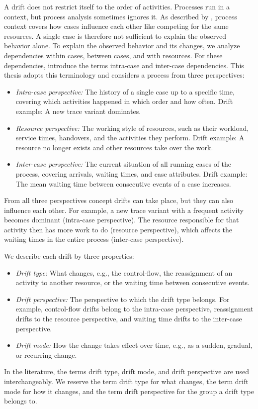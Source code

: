 A drift does not restrict itself to the order of activities. Processes run in a context, but process analysis sometimes ignores it. As described by \textcite{vanderaalst2016process}, process context covers how cases influence each other like competing for the same resources. A single case is therefore not sufficient to explain the observed behavior alone. To explain the observed behavior and its changes, we analyze dependencies within cases, between cases, and with resources. For these dependencies, \textcite{senderovich2017intra} introduce the terms intra-case and inter-case dependencies. This thesis adopts this terminology and considers a process from three perspectives:
\begin{itemize}
	\item \emph{Intra-case perspective:} The history of a single case up to a specific time, covering which activities happened in which order and how often. Drift example: A new trace variant dominates.
	\item \emph{Resource perspective:} The working style of resources, such as their workload, service times, handovers, and the activities they perform. Drift example: A resource no longer exists and other resources take over the work.
	\item \emph{Inter-case perspective:} The current situation of all running cases of the process, covering arrivals, waiting times, and case attributes. Drift example: The mean waiting time between consecutive events of a case increases.
\end{itemize}

From all three perspectives concept drifts can take place, but they can also influence each other. For example, a new trace variant with a frequent activity becomes dominant (intra-case perspective). The resource responsible for that activity then has more work to do (resource perspective), which affects the waiting times in the entire process (inter-case perspective).

We describe each drift by three properties:
\begin{itemize}
	\item \emph{Drift type:} What changes, e.g., the control-flow, the reassignment of an activity to another resource, or the waiting time between consecutive events.
	\item \emph{Drift perspective:} The perspective to which the drift type belongs. For example, control-flow drifts belong to the intra-case perspective, reassignment drifts to the resource perspective, and waiting time drifts to the inter-case perspective.
	\item \emph{Drift mode:} How the change takes effect over time, e.g., as a sudden, gradual, or recurring change.
\end{itemize}
In the literature, the terms drift type, drift mode, and drift perspective are used interchangeably. We reserve the term drift type for what changes, the term drift mode for how it changes, and the term drift perspective for the group a drift type belongs to.

